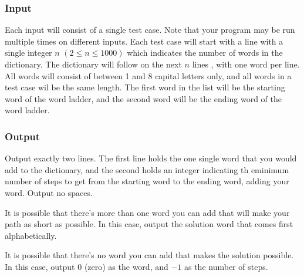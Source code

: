 \subsubsection{Input}
Each input will consist of a single test case.
Note that your program may be run multiple times on different inputs.
Each test case will start with a line with a single integer $n$ $(2 \le n \le 1000)$ which indicates the number of words in the dictionary.
The dictionary will follow on the next $n$ lines , with one word per line.
All words will consist of between 1 and 8 capital letters only, and all words in a test case wil be the same length.
The first word in the list will be the starting word of the word ladder, and the second word will be the ending word of the word ladder.

\subsubsection{Output}
Output exactly two lines.
The first line holds the one single word that you would add to the dictionary, and the second holds an integer indicating th eminimum number of steps to get from the starting word to the ending word, adding your word. Output no spaces.

It is possible that there's more than one word you can add that will make your path as short as possible.
In this case, output the solution word that comes first alphabetically.

It is possible that there's no word you can add that makes the solution possible.
In this case, output $0$ (zero) as the word, and $-1$ as the number of steps.
